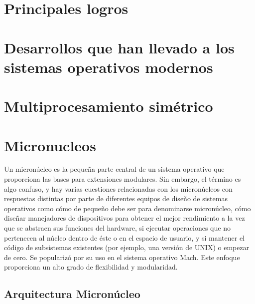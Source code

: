\documentclass[10pt,a4paper,spanish]{report}
\begin{document}
  \noindent


  \section{Principales logros}

  \noindent


  \section{Desarrollos que han llevado a los sistemas operativos modernos}

  \noindent


  \section{Multiprocesamiento simétrico}

  \noindent


  \section{Micronucleos}

  \noindent
  Un micronúcleo es la pequeña parte central de un sistema operativo que proporciona las bases para extensiones modulares. Sin embargo, el término es algo confuso, y hay varias cuestiones relacionadas con los micronúcleos con respuestas distintas por parte de diferentes equipos de diseño de sistemas operativos como cómo de pequeño debe ser para denominarse micronúcleo, cómo diseñar manejadores de dispositivos para obtener el mejor rendimiento a la vez que se abstraen sus funciones del hardware, si ejecutar operaciones que no pertenecen al núcleo dentro de éste o en el espacio de usuario, y si mantener el código de subsistemas existentes (por ejemplo, una versión de UNIX) o empezar de cero. Se popularizó por su uso en el sistema operativo Mach. Este enfoque proporciona un alto grado de flexibilidad y modularidad.

  \subsection{Arquitectura Micronúcleo}
\end{document}

